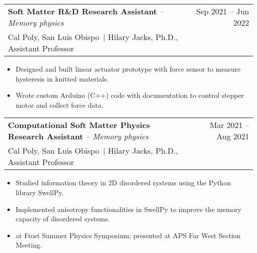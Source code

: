 \documentclass[a4paper,11pt]{article}
\makeatletter
\newcommand{\colhref}[3]{\href{#2}{\color{#1}{#3}}} %
\newenvironment{jobcustomlong}[4]
    {
    \begin{tabularx}{\linewidth}{@{}l X r@{}}
    \textbf{#1} \textit{#2} & \hfill &  #3 \\[-2.5pt]
    \textcolor{black!55!white}{\small #4} \\[2.5pt]
    \end{tabularx}
    \begin{minipage}[t]{\linewidth}
    \begin{itemize}[nosep,after=\strut, leftmargin=1.75em, itemsep=1pt,label={\small$\bullet$}]
    }
    {
    \end{itemize} \vspace{.325em}
    \end{minipage}   
    }
\newcommand{\calpoly}{\textcolor{black!55!white}{Cal Poly, San Luis Obispo}}
\makeatother
\begin{document}
\begin{jobcustomlong}{Soft Matter R\&D Research Assistant}{-- Memory physics}{Sep 2021 -- Jun 2022}{\calpoly\ $\vert$ Hilary Jacks, Ph.D., Assistant Professor}
    \item Designed and built linear actuator prototype with force sensor to measure hysteresis in knitted materials.
    \item Wrote custom Arduino (C++) code with documentation to control stepper motor and collect force data.
\end{jobcustomlong}
\begin{jobcustomlong}{Computational Soft Matter Physics Research Assistant}{-- Memory physics}{Mar 2021 -- Aug 2021}{\calpoly\ $\vert$ Hilary Jacks, Ph.D., Assistant Professor}
    \item Studied information theory in 2D disordered systems using the Python library SwellPy.
    \item Implemented anisotropy functionalities in SwellPy to improve the memory capacity of disordered systems.
    \item \colhref{blue!65!black}{https://docs.google.com/presentation/d/1XdPL6FM-Nhcb5U-06zQodZRGSYDMoiufV3TQnuubFIQ/edit?usp=sharing}{Presented} at Frost Summer Physics Symposium; presented \colhref{blue!65!black}{https://docs.google.com/presentation/d/1gc6V4EIddg6weyhoOCH6Uc6ZFkzSfBEEbIQB2iCvSrg/edit?usp=sharing}{poster} at APS Far West Section Meeting. 
\end{jobcustomlong}
\end{document}
